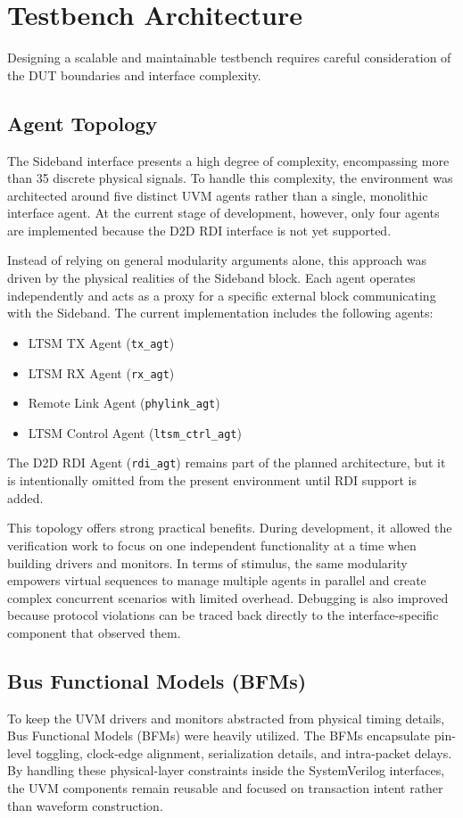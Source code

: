 \section{Testbench Architecture}
Designing a scalable and maintainable testbench requires careful consideration of the DUT boundaries and interface complexity. 

\subsection{Agent Topology}
The Sideband interface presents a high degree of complexity, encompassing more than 35 discrete physical signals. To handle this complexity, the environment was architected around five distinct UVM agents rather than a single, monolithic interface agent. At the current stage of development, however, only four agents are implemented because the D2D RDI interface is not yet supported.

Instead of relying on general modularity arguments alone, this approach was driven by the physical realities of the Sideband block. Each agent operates independently and acts as a proxy for a specific external block communicating with the Sideband. The current implementation includes the following agents:
\begin{itemize}
    \item LTSM TX Agent (\texttt{tx\_agt})
    \item LTSM RX Agent (\texttt{rx\_agt})
    \item Remote Link Agent (\texttt{phylink\_agt})
    \item LTSM Control Agent (\texttt{ltsm\_ctrl\_agt})
\end{itemize}

The D2D RDI Agent (\texttt{rdi\_agt}) remains part of the planned architecture, but it is intentionally omitted from the present environment until RDI support is added.

This topology offers strong practical benefits. During development, it allowed the verification work to focus on one independent functionality at a time when building drivers and monitors. In terms of stimulus, the same modularity empowers virtual sequences to manage multiple agents in parallel and create complex concurrent scenarios with limited overhead. Debugging is also improved because protocol violations can be traced back directly to the interface-specific component that observed them.

\subsection{Bus Functional Models (BFMs)}
To keep the UVM drivers and monitors abstracted from physical timing details, Bus Functional Models (BFMs) were heavily utilized. The BFMs encapsulate pin-level toggling, clock-edge alignment, serialization details, and intra-packet delays. By handling these physical-layer constraints inside the SystemVerilog interfaces, the UVM components remain reusable and focused on transaction intent rather than waveform construction.

